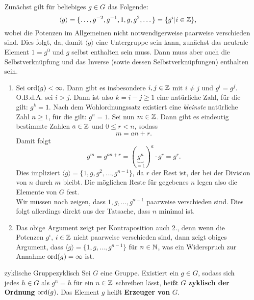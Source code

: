 \begin{beweis}
Zunächst gilt für beliebiges $g \in G$ das Folgende:
\begin{equation}
\langle g \rangle = \{ \dots,g^{-2},g^{-1},1, g, g^2, \dots \} = \{g^i | i \in \mathbb{Z}\},
\end{equation}
wobei die Potenzen im Allgemeinen nicht notwendigerweise paarweise verschieden sind.
Dies folgt, da, damit $\langle g \rangle$ eine Untergruppe sein kann, zunächst das neutrale Element $1 = g^0$ und $g$ selbst enthalten sein muss. Dann muss aber auch die Selbstverknüpfung und das Inverse (sowie dessen Selbstverknüpfungen) enthalten sein.
\begin{enumerate}
\item Sei $\operatorname{\text{ord}} (g) < \infty$. Dann gibt es insbesondere $i,j \in \mathbb{Z}$ mit $i \neq j$ und $g^i = g^j$. O.B.d.A. sei $i > j$. Dann ist also $k = i-j \geq 1$ eine natürliche Zahl, für die gilt: $g^k = 1$. Nach dem Wohlordnungssatz existiert eine \textit{kleinste} natürliche Zahl $n \geq 1$, für die gilt: $g^n =1$. Sei nun $m \in \mathbb{Z}$. Dann gibt es eindeutig bestimmte Zahlen $a \in \mathbb{Z}$ und $0 \leq r < n$, sodass \begin{equation}
m = an +r.
\end{equation}
Damit folgt
\begin{equation}
g^m = g^{an+r} = (\underbrace{g^n}_{=1})^a \cdot g^r = g^r.
\end{equation}
Dies impliziert $\langle g \rangle = \{1,g,g^2,\dots, g^{n-1}\}$, da $r$ der Rest ist, der bei der Division von $n$ durch $m$ bleibt. Die möglichen Reste für gegebenes $n$ legen also die Elemente von $G$ fest.\\
Wir müssen noch zeigen, dass $1, g, \dots, g^{n-1}$ paarweise verschieden sind. Dies folgt allerdings direkt aus der Tatsache, dass $n$ minimal ist.
\item Das obige Argument zeigt per Kontraposition auch 2., denn wenn die Potenzen $g^i$, $i \in \mathbb{Z}$ nicht paarweise verschieden sind, dann zeigt obiges Argument, dass $\langle g \rangle = \{1,g,\dots, g^{n-1}\}$ für $n \in \mathbb{N}$, was ein Widerspruch zur Annahme $\operatorname{\text{ord}} (g) = \infty$ ist.
\end{enumerate}
\end{beweis}
\begin{definition}{zyklische Gruppe}{zyklisch}
Sei $G$ eine Gruppe. Existiert ein $g\in G$, sodass sich jedes $h \in G$ als $g^n = h$ für ein $n \in \mathbb{Z}$ schreiben lässt, heißt $G$ \textbf{zyklisch der Ordnung} $\operatorname{\text{ord}} (g)$. Das Element $g$ heißt \textbf{Erzeuger von} $G$.
\end{definition}

